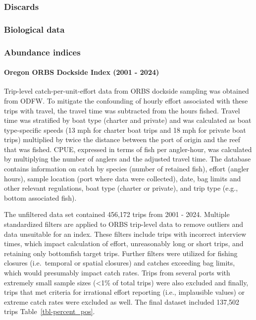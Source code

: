 \documentclass[
]{scrartcl}
\let\oldparagraph\paragraph
\renewcommand{\paragraph}[1]{\oldparagraph{#1}\mbox{}}
\begin{document}
\subsubsection{Discards}\label{discards}

\subsubsection{Biological data}\label{biological-data}

\subsubsection{Abundance indices}\label{abundance-indices}

\paragraph{Oregon ORBS Dockside Index (2001 -
2024)}\label{oregon-orbs-dockside-index-2001---2024}

Trip-level catch-per-unit-effort data from ORBS dockside sampling was
obtained from ODFW. To mitigate the confounding of hourly effort
associated with these trips with travel, the travel time was subtracted
from the hours fished. Travel time was stratified by boat type (charter
and private) and was calculated as boat type-specific speeds (13 mph for
charter boat trips and 18 mph for private boat trips) multiplied by
twice the distance between the port of origin and the reef that was
fished. CPUE, expressed in terms of fish per angler-hour, was calculated
by multiplying the number of anglers and the adjusted travel time. The
database contains information on catch by species (number of retained
fish), effort (angler hours), sample location (port where data were
collected), date, bag limits and other relevant regulations, boat type
(charter or private), and trip type (e.g., bottom associated fish).

The unfiltered data set contained 456,172 trips from 2001 - 2024.
Multiple standardized filters are applied to ORBS trip-level data to
remove outliers and data unsuitable for an index. These filters include
trips with incorrect interview times, which impact calculation of
effort, unreasonably long or short trips, and retaining only bottomfish
target trips. Further filters were utilized for fishing closures
(i.e.~temporal or spatial closures) and catches exceeding bag limits,
which would presumably impact catch rates. Trips from several ports with
extremely small sample sizes (\textless1\% of total trips) were also
excluded and finally, trips that met criteria for irrational effort
reporting (i.e., implausible values) or extreme catch rates were
excluded as well. The final dataset included 137,502 trips
Table~\ref{tbl-percent_pos}.
\end{document}
